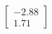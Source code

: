 \documentclass[preview]{standalone}
\begin{document}
\begin{align*}
\begin{bmatrix} -2.88 \\ 1.71 \end{bmatrix}
\end{align*}
\end{document}
